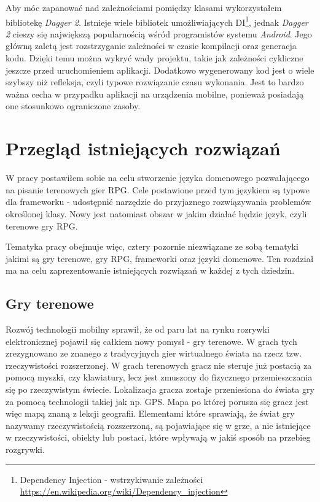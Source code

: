 \documentclass[openright]{xmgr}
\begin{document}
Aby móc zapanować nad zależnościami pomiędzy klasami wykorzystałem bibliotekę \textit{Dagger 2}.
Istnieje wiele bibliotek umożliwiających DI\footnote{Dependency Injection - wstrzykiwanie zależności \url{https://en.wikipedia.org/wiki/Dependency_injection}}, jednak \textit{Dagger 2} cieszy się największą popularnością wśród programistów systemu \textit{Android}. Jego główną zaletą jest rozstrzyganie zależności w czasie kompilacji oraz generacja kodu. Dzięki temu można wykryć wady projektu, takie jak zależności cykliczne jeszcze przed uruchomieniem aplikacji. Dodatkowo wygenerowany kod jest o wiele szybszy niż refleksja, czyli typowe rozwiązanie czasu wykonania. Jest to bardzo ważna cecha w przypadku aplikacji na urządzenia mobilne, ponieważ posiadają one stosunkowo ograniczone zasoby. 

\chapter{Przegląd istniejących rozwiązań}

W pracy postawiłem sobie na celu stworzenie języka domenowego pozwalającego na pisanie terenowych gier RPG. Cele postawione przed tym językiem są typowe dla frameworku - udostępnić narzędzie do przyjaznego rozwiązywania problemów określonej klasy. Nowy jest natomiast obszar w jakim działać będzie język, czyli terenowe gry RPG.

Tematyka pracy obejmuje więc, cztery pozornie niezwiązane ze sobą tematyki jakimi są gry terenowe, gry RPG, frameworki oraz języki domenowe. Ten rozdział ma na celu zaprezentowanie istniejących rozwiązań w każdej z tych dziedzin.

\section{Gry terenowe}

Rozwój technologii mobilny sprawił, że od paru lat na rynku rozrywki elektronicznej pojawił się całkiem nowy pomysł - gry terenowe. W grach tych zrezygnowano ze znanego z tradycyjnych gier wirtualnego świata na rzecz tzw. rzeczywistości rozszerzonej. W grach terenowych gracz nie steruje już postacią za pomocą myszki, czy klawiatury, lecz jest zmuszony do fizycznego przemieszczania się po rzeczywistym świecie. Lokalizacja gracza zostaje przeniesiona do świata gry za pomocą technologii takiej jak np. GPS. Mapa po której porusza się gracz jest więc mapą znaną z lekcji geografii. Elementami które sprawiają, że świat gry nazywamy rzeczywistością rozszerzoną, są pojawiające się w grze, a nie istniejące w rzeczywistości, obiekty lub postaci, które wpływają w jakiś sposób na przebieg rozgrywki.
\end{document}
